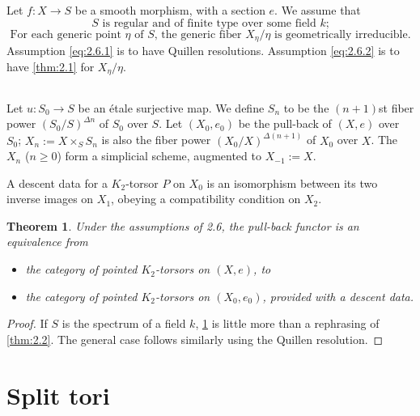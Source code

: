 \documentclass[11pt,a4paper]{article}
\theoremstyle{plain}
\newtheorem{theorem}{Theorem}[section]
\theoremstyle{definition}
\begin{document}
\subsection{}
Let $f: X \to S$ be a smooth morphism, with a section $e$. We assume that
\begin{equation}\label{eq:2.6.1}
\text{$S$ is regular and of finite type over some field $k$;}
\end{equation}
\begin{equation}\label{eq:2.6.2}
\text{For each generic point $\eta$ of $S$, the generic fiber $X_\eta/\eta$ is geometrically irreducible.}
\end{equation}
Assumption \eqref{eq:2.6.1} is to have Quillen resolutions. Assumption \eqref{eq:2.6.2} is to have \ref{thm:2.1} for $X_\eta/\eta$.

\subsection{}
Let $u: S_0 \to S$ be an \'etale surjective map. We define $S_n$ to be the $(n+1)$st fiber power $(S_0/S)^{\Delta n}$ of $S_0$ over $S$. Let $(X_0, e_0)$ be the pull-back of $(X, e)$ over $S_0$; $X_n := X \times_S S_n$ is also the fiber power $(X_0/X)^{\Delta(n+1)}$ of $X_0$ over $X$. The $X_n$ ($n \geq 0$) form a simplicial scheme, augmented to $X_{-1} := X$.

A descent data for a $K_2$-torsor $P$ on $X_0$ is an isomorphism between its two inverse images on $X_1$, obeying a compatibility condition on $X_2$.

\begin{theorem}\label{thm:2.7}
Under the assumptions of 2.6, the pull-back functor is an equivalence from
\begin{itemize}
\item[(a)] the category of pointed $K_2$-torsors on $(X,e)$, to
\item[(b)] the category of pointed $K_2$-torsors on $(X_0, e_0)$, provided with a descent data.
\end{itemize}
\end{theorem}

\begin{proof}
If $S$ is the spectrum of a field $k$, \ref{thm:2.7} is little more than a rephrasing of \ref{thm:2.2}. The general case follows similarly using the Quillen resolution.
\end{proof}

\section{Split tori}
\end{document}
